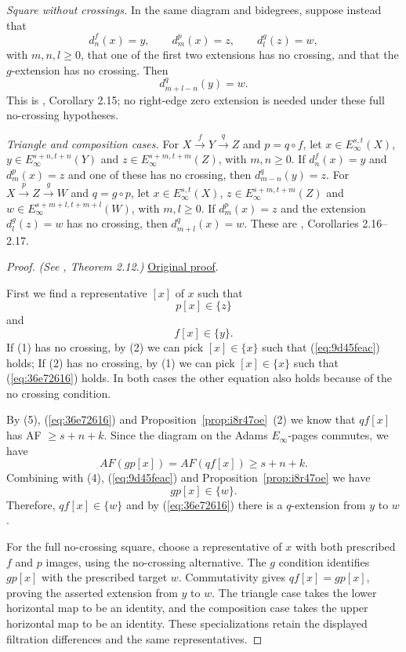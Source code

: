 \begin{theorem}
\textit{Square without crossings.}
In the same diagram and bidegrees, suppose instead that
\[
 d_n^f(x)=y,\qquad d_m^p(x)=z,\qquad d_l^g(z)=w,
\]
with $m,n,l\ge0$, that one of the first two extensions has no crossing,
and that the $g$-extension has no crossing. Then
\[
 d_{m+l-n}^q(y)=w.
\]
This is \cite{LWX126}, Corollary 2.15; no right-edge zero extension is
needed under these full no-crossing hypotheses.

\textit{Triangle and composition cases.}
For $X\xrightarrow fY\xrightarrow qZ$ and $p=q\circ f$, let
$x\in E_\infty^{s,t}(X)$,
$y\in E_\infty^{s+n,t+n}(Y)$ and
$z\in E_\infty^{s+m,t+m}(Z)$, with $m,n\ge0$.
If $d_n^f(x)=y$ and $d_m^p(x)=z$ and one of these has no crossing, then
$d_{m-n}^q(y)=z$.
For $X\xrightarrow pZ\xrightarrow gW$ and $q=g\circ p$, let
$x\in E_\infty^{s,t}(X)$,
$z\in E_\infty^{s+m,t+m}(Z)$ and
$w\in E_\infty^{s+m+l,t+m+l}(W)$, with $m,l\ge0$.
If $d_m^p(x)=z$ and the extension $d_l^g(z)=w$ has no crossing, then
$d_{m+l}^q(x)=w$. These are \cite{LWX126}, Corollaries 2.16--2.17.
\end{theorem}
\begin{proof}
\textit{(See \cite{LWX126}, Theorem 2.12.)} \href{paper/main.tex.html#L483}{Original proof}.

First we find a representative $[x]$ of $x$ such that
    \begin{equation}\label{eq:9d45feac}
        p[x]\in \{z\}
    \end{equation}
    and
    \begin{equation}\label{eq:36e72616}
        f[x]\in \{y\}.
    \end{equation}
    If (1) has no crossing, by (2) we can pick $[x]\in \{x\}$ such that (\ref{eq:9d45feac}) holds;
    If (2) has no crossing, by (1) we can pick $[x]\in \{x\}$ such that  (\ref{eq:36e72616}) holds.
    In both cases the other equation also holds because of the no crossing condition.

    By (5), (\ref{eq:36e72616}) and Proposition~\ref{prop:i8r47oe}~(2) we know that $qf[x]$ has AF $\ge s+n+k$. Since the diagram on the Adams $E_\infty$-pages commutes, we have
    $$AF(gp[x])=AF(qf[x])\ge s+n+k.$$
    Combining with (4), (\ref{eq:9d45feac}) and Proposition~\ref{prop:i8r47oe} we have
    $$gp[x]\in \{w\}.$$
    Therefore, $qf[x]\in \{w\}$ and by (\ref{eq:36e72616}) there is a $q$-extension from $y$ to $w$.

For the full no-crossing square, choose a representative of $x$ with
both prescribed $f$ and $p$ images, using the no-crossing alternative.
The $g$ condition identifies $gp[x]$ with the prescribed target $w$.
Commutativity gives $qf[x]=gp[x]$, proving the asserted extension from
$y$ to $w$. The triangle case takes the lower horizontal map to be an
identity, and the composition case takes the upper horizontal map to
be an identity. These specializations retain the displayed filtration
differences and the same representatives.
\end{proof}

